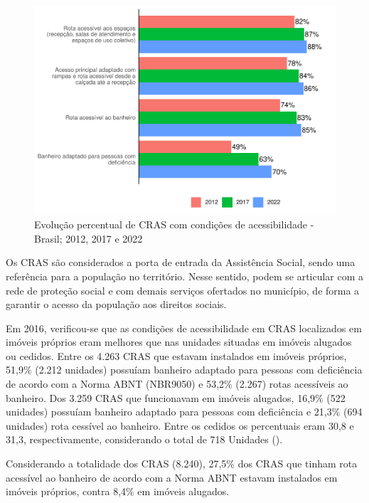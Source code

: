 \documentclass[
  brazilian]{report}
\begin{document}
\begin{figure}
\includegraphics{Censo-SUAS-2022_files/figure-latex/CRAS-acessibilidade-1} \caption[Evolução percentual de CRAS com condições de acessibilidade - Brasil]{Evolução percentual de CRAS com condições de acessibilidade - Brasil; 2012, 2017 e 2022}\label{fig:CRAS-acessibilidade}
\end{figure}

Os CRAS são considerados a porta de entrada da Assistência Social, sendo
uma referência para a população no território. Nesse sentido, podem se
articular com a rede de proteção social e com demais serviços ofertados
no município, de forma a garantir o acesso da população aos direitos
sociais.

Em 2016, verificou-se que as condições de acessibilidade em CRAS
localizados em imóveis próprios eram melhores que nas unidades situadas
em imóveis alugados ou cedidos. Entre os 4.263 CRAS que estavam
instalados em imóveis próprios, 51,9\% (2.212 unidades) possuíam
banheiro adaptado para pessoas com deficiência de acordo com a Norma
ABNT (NBR9050) e 53,2\% (2.267) rotas acessíveis ao banheiro. Dos 3.259
CRAS que funcionavam em imóveis alugados, 16,9\% (522 unidades) possuíam
banheiro adaptado para pessoas com deficiência e 21,3\% (694 unidades)
rota cessível ao banheiro. Entre os cedidos os percentuais eram 30,8 e
31,3, respectivamente, considerando o total de 718 Unidades
().

Considerando a totalidade dos CRAS (8.240), 27,5\% dos CRAS que tinham
rota acessível ao banheiro de acordo com a Norma ABNT estavam instalados
em imóveis próprios, contra 8,4\% em imóveis alugados.
\end{document}
